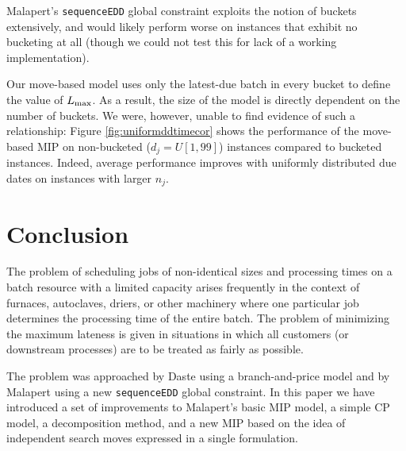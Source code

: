 \documentclass[13pt, letterpaper, oneside]{book}
\begin{document}
Malapert's \texttt{sequenceEDD} global constraint exploits the notion of buckets
extensively, and would likely perform worse on instances that exhibit no
bucketing at all (though we could not test this for lack of a working
implementation).

Our move-based model uses only the latest-due batch in every bucket to define
the value of $L_{\text{max}}$. As a result, the size of the model is directly dependent
on the number of buckets. We were, however, unable to find evidence of such a
relationship: Figure \ref{fig:uniformddtimecor} shows the performance of the
move-based MIP on non-bucketed ($d_j = U[1, 99]$) instances compared to bucketed
instances.  Indeed, average performance improves with uniformly distributed due dates on
instances with larger $n_j$.



\chapter{Conclusion}\label{sec:futurework}
The problem of scheduling jobs of non-identical sizes and processing times on a
batch resource with a limited capacity arises frequently in the context of
furnaces, autoclaves, driers, or other machinery where one particular job
determines the processing time of the entire batch. The problem of minimizing
the maximum lateness is given in situations in which all customers (or
downstream processes) are to be treated as fairly as possible.

The problem was approached by Daste \citet{daste1} using a branch-and-price
model and by Malapert \citet{Malapert} using a new \texttt{sequenceEDD} global
constraint. In this paper we have introduced a set of improvements to Malapert's
basic MIP model, a simple CP model, a decomposition method, and a new MIP based
on the idea of independent search moves expressed in a single formulation.
\end{document}
